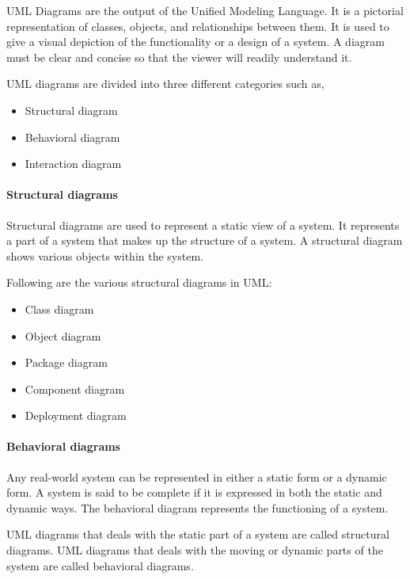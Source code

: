 \documentclass[
]{article}
\providecommand{\tightlist}{%
  \setlength{\itemsep}{0pt}\setlength{\parskip}{0pt}}
\begin{document}
UML Diagrams are the output of the Unified Modeling Language. It is a
pictorial representation of classes, objects, and relationships between
them. It is used to give a visual depiction of the functionality or a
design of a system. A diagram must be clear and concise so that the
viewer will readily understand it.

UML diagrams are divided into three different categories such as,

\begin{itemize}
\tightlist
\item
  Structural diagram
\item
  Behavioral diagram
\item
  Interaction diagram
\end{itemize}

\hypertarget{structural-diagrams}{%
\paragraph{Structural diagrams}\label{structural-diagrams}}

Structural diagrams are used to represent a static view of a system. It
represents a part of a system that makes up the structure of a system. A
structural diagram shows various objects within the system.

Following are the various structural diagrams in UML:

\begin{itemize}
\tightlist
\item
  Class diagram
\item
  Object diagram
\item
  Package diagram
\item
  Component diagram
\item
  Deployment diagram
\end{itemize}

\hypertarget{behavioral-diagrams}{%
\paragraph{Behavioral diagrams}\label{behavioral-diagrams}}

Any real-world system can be represented in either a static form or a
dynamic form. A system is said to be complete if it is expressed in both
the static and dynamic ways. The behavioral diagram represents the
functioning of a system.

UML diagrams that deals with the static part of a system are called
structural diagrams. UML diagrams that deals with the moving or dynamic
parts of the system are called behavioral diagrams.
\end{document}

